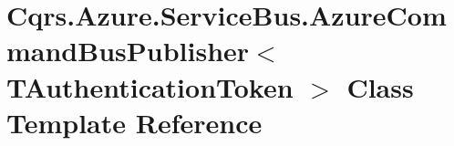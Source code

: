 \hypertarget{classCqrs_1_1Azure_1_1ServiceBus_1_1AzureCommandBusPublisher}{}\section{Cqrs.\+Azure.\+Service\+Bus.\+Azure\+Command\+Bus\+Publisher$<$ T\+Authentication\+Token $>$ Class Template Reference}
\label{classCqrs_1_1Azure_1_1ServiceBus_1_1AzureCommandBusPublisher}
